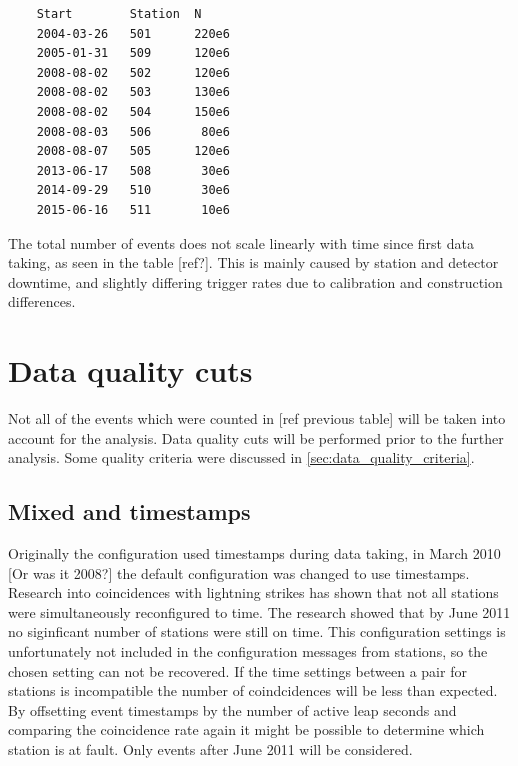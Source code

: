 \begin{verbatim}
    Start        Station  N
    2004-03-26   501      220e6
    2005-01-31   509      120e6
    2008-08-02   502      120e6
    2008-08-02   503      130e6
    2008-08-02   504      150e6
    2008-08-03   506       80e6
    2008-08-07   505      120e6
    2013-06-17   508       30e6
    2014-09-29   510       30e6
    2015-06-16   511       10e6
\end{verbatim}

The total number of events does not scale linearly with time since first data taking, as seen in the table [ref?]. This is mainly caused by station and detector downtime, and slightly differing trigger rates due to calibration and construction differences.


\section{Data quality cuts}

Not all of the events which were counted in [ref previous table] will be taken into account for the analysis. Data quality cuts will be performed prior to the further analysis. Some quality criteria were discussed in \cref{sec:data_quality_criteria}.


\subsection{Mixed \utc and \gps timestamps}

Originally the \gps configuration used \utc timestamps during data taking, in March 2010 [Or was it 2008?] the default configuration was changed to use \gps timestamps. Research into coincidences with lightning strikes has shown that not all \hisparc stations were simultaneously reconfigured to \gps time. The research showed that by June 2011 no siginficant number of stations were still on \utc time. This configuration settings is unfortunately not included in the configuration messages from stations, so the chosen setting can not be recovered. If the time settings between a pair for stations is  incompatible the number of coindcidences will be less than expected. By offsetting event timestamps by the number of active leap seconds and comparing the coincidence rate again it might be possible to determine which station is at fault. Only  events after June 2011 will be considered.


